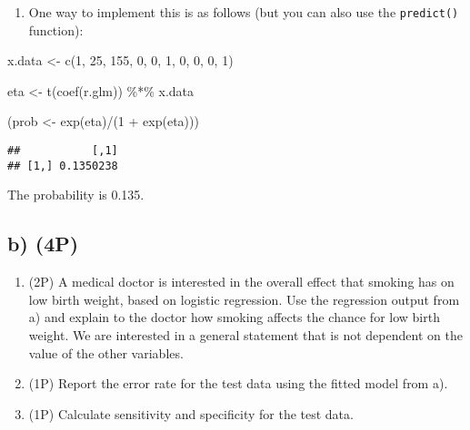 \documentclass[
]{article}
\newenvironment{Shaded}{\begin{snugshade}}{\end{snugshade}}
\newcommand{\DecValTok}[1]{\textcolor[rgb]{0.00,0.00,0.81}{#1}}
\newcommand{\FunctionTok}[1]{\textcolor[rgb]{0.00,0.00,0.00}{#1}}
\newcommand{\NormalTok}[1]{#1}
\newcommand{\OtherTok}[1]{\textcolor[rgb]{0.56,0.35,0.01}{#1}}
\newcommand{\SpecialCharTok}[1]{\textcolor[rgb]{0.00,0.00,0.00}{#1}}
\providecommand{\tightlist}{%
  \setlength{\itemsep}{0pt}\setlength{\parskip}{0pt}}
\begin{document}
\begin{enumerate}
\def\labelenumi{(\roman{enumi})}
\setcounter{enumi}{1}
\tightlist
\item
  One way to implement this is as follows (but you can also use the
  \texttt{predict()} function):
\end{enumerate}

\begin{Shaded}
\begin{Highlighting}[]
\NormalTok{x.data }\OtherTok{\textless{}{-}} \FunctionTok{c}\NormalTok{(}\DecValTok{1}\NormalTok{, }\DecValTok{25}\NormalTok{, }\DecValTok{155}\NormalTok{, }\DecValTok{0}\NormalTok{, }\DecValTok{0}\NormalTok{, }\DecValTok{1}\NormalTok{, }\DecValTok{0}\NormalTok{, }\DecValTok{0}\NormalTok{, }\DecValTok{0}\NormalTok{, }\DecValTok{1}\NormalTok{)}

\NormalTok{eta }\OtherTok{\textless{}{-}} \FunctionTok{t}\NormalTok{(}\FunctionTok{coef}\NormalTok{(r.glm)) }\SpecialCharTok{\%*\%}\NormalTok{ x.data}

\NormalTok{(prob }\OtherTok{\textless{}{-}} \FunctionTok{exp}\NormalTok{(eta)}\SpecialCharTok{/}\NormalTok{(}\DecValTok{1} \SpecialCharTok{+} \FunctionTok{exp}\NormalTok{(eta)))}
\end{Highlighting}
\end{Shaded}

\begin{verbatim}
##           [,1]
## [1,] 0.1350238
\end{verbatim}

The probability is 0.135.

\hypertarget{b-4p}{%
\subsection{b) (4P)}\label{b-4p}}

\begin{enumerate}
\def\labelenumi{(\roman{enumi})}
\item
  (2P) A medical doctor is interested in the overall effect that smoking
  has on low birth weight, based on logistic regression. Use the
  regression output from a) and explain to the doctor how smoking
  affects the chance for low birth weight. We are interested in a
  general statement that is not dependent on the value of the other
  variables.
\item
  (1P) Report the error rate for the test data using the fitted model
  from a).
\item
  (1P) Calculate sensitivity and specificity for the test data.
\end{enumerate}
\end{document}
